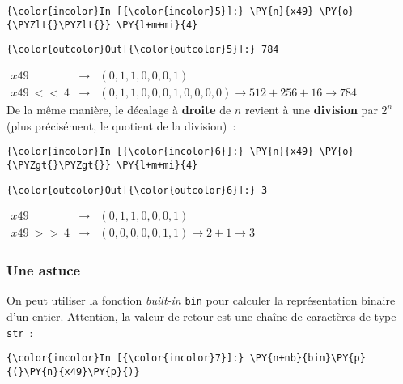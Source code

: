     \begin{Verbatim}[commandchars=\\\{\}]
{\color{incolor}In [{\color{incolor}5}]:} \PY{n}{x49} \PY{o}{\PYZlt{}\PYZlt{}} \PY{l+m+mi}{4}
\end{Verbatim}


\begin{Verbatim}[commandchars=\\\{\}]
{\color{outcolor}Out[{\color{outcolor}5}]:} 784
\end{Verbatim}
            
    \(\begin{array}{rcl} x49 & \rightarrow & (0,1,1,0,0,0,1) \\ x49\ <<\ 4 & \rightarrow & (0,1,1,0,0,0,1,0,0,0,0) \rightarrow 512 + 256 + 16 \rightarrow 784 \end{array}\)\\

    De la même manière, le décalage à \textbf{droite} de \(n\) revient à une
\textbf{division} par \(2^n\) (plus précisément, le quotient de la
division)~:

    \begin{Verbatim}[commandchars=\\\{\}]
{\color{incolor}In [{\color{incolor}6}]:} \PY{n}{x49} \PY{o}{\PYZgt{}\PYZgt{}} \PY{l+m+mi}{4}
\end{Verbatim}


\begin{Verbatim}[commandchars=\\\{\}]
{\color{outcolor}Out[{\color{outcolor}6}]:} 3
\end{Verbatim}
            
    \(\begin{array}{rcl} x49 & \rightarrow & (0,1,1,0,0,0,1) \\ x49\ >>\ 4 & \rightarrow & (0,0,0,0,0,1,1) \rightarrow 2 + 1 \rightarrow 3 \end{array}\)

    \hypertarget{une-astuce}{%
\subsubsection{Une astuce}\label{une-astuce}}

    On peut utiliser la fonction \emph{built-in} \texttt{bin} pour calculer
la représentation binaire d'un entier. Attention, la valeur de retour
est une chaîne de caractères de type \texttt{str}~:

    \begin{Verbatim}[commandchars=\\\{\}]
{\color{incolor}In [{\color{incolor}7}]:} \PY{n+nb}{bin}\PY{p}{(}\PY{n}{x49}\PY{p}{)}
\end{Verbatim}


